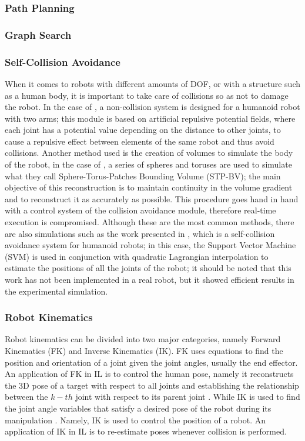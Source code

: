 \documentclass[thesis]{mas_proposal}
\begin{document}
	\subsubsection{Path Planning}
		
	
	\subsubsection{Graph Search}
		
	
	\subsubsection{Self-Collision Avoidance}

		When it comes to robots with different amounts of DOF, or with a structure such as a human body, it is important to take care of collisions so as not to damage the robot. In the case of \cite{Dietrich2012, Santis2007}, a non-collision system is designed for a humanoid robot with two arms; this module is based on artificial repulsive potential fields, where each joint has a potential value depending on the distance to other joints, to cause a repulsive effect between elements of the same robot and thus avoid collisions. Another method used is the creation of volumes to simulate the body of the robot, in the case of \cite{Stasse2008}, a series of spheres and toruses are used to simulate what they call Sphere-Torus-Patches Bounding Volume (STP-BV); the main objective of this reconstruction is to maintain continuity in the volume gradient and to reconstruct it as accurately as possible. This procedure goes hand in hand with a control system of the collision avoidance module, therefore real-time execution is compromised. Although these are the most common methods, there are also simulations such as the work presented in \cite{Fang2015}, which is a self-collision avoidance system for humanoid robots; in this case, the Support Vector Machine (SVM) is used in conjunction with quadratic Lagrangian interpolation to estimate the positions of all the joints of the robot; it should be noted that this work has not been implemented in a real robot, but it showed efficient results in the experimental simulation.

	\subsubsection{Robot Kinematics}
	
		Robot kinematics can be divided into two major categories, namely Forward Kinematics (FK) and Inverse Kinematics (IK). FK uses equations to find the position and orientation of a joint given the joint angles, usually the end effector. An application of FK in IL is to control the human pose, namely it reconstructs the 3D pose of a target with respect to all joints and establishing the relationship between the $k-th$ joint with respect to its parent joint \cite{Li2021}. While IK is used to find the joint angle variables that satisfy a desired pose of the robot during its manipulation \cite{Hayat2015}. Namely, IK is used to control the position of a robot. An application of IK in IL is to re-estimate poses whenever collision is performed.
		
\end{document}
